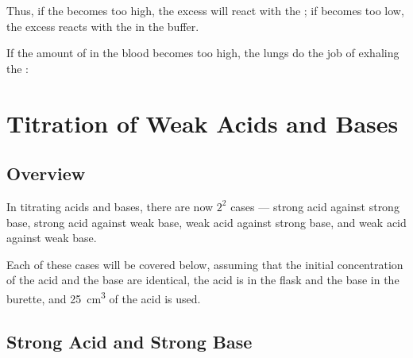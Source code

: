 			Thus, if the \pH{} becomes too high, the excess  will react with the ; if \pH{} becomes too low, the
			excess  reacts with the  in the buffer.



			If the amount of  in the blood becomes too high, the lungs do the job of exhaling the :







	\pagebreak
	\section{Titration of Weak Acids and Bases}

		\subsection{Overview}

			In titrating acids and bases, there are now $2^2$ cases --- strong acid against strong base, strong acid against weak base,
			weak acid against strong base, and weak acid against weak base.

			Each of these cases will be covered below, assuming that the initial concentration of the acid and the base are identical,
			the acid is in the flask and the base in the burette, and \SI{25}{\cubic\centi\metre} of the acid is used.


		\subsection{Strong Acid and Strong Base}

